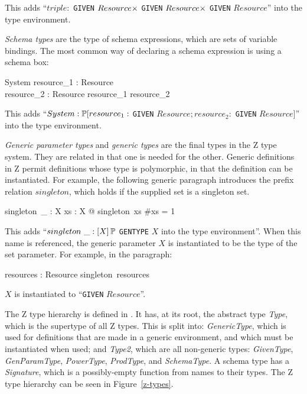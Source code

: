 This adds ``$triple : $ {\tt GIVEN}
$Resource \cross$ {\tt GIVEN} $Resource \cross$ {\tt GIVEN} $Resource$''
into the type environment.

{\em Schema types} are the type of schema expressions, which are sets
of variable bindings. The most common way of declaring a schema
expression is using a schema box:
\begin{schema}{System}
  resource_1 : Resource\\
  resource_2 : Resource
\where
  resource_1 \neq resource_2
\end{schema}

This adds ``$System
: \power [resource_1 : $ {\tt GIVEN} $Resource; resource_2 : $ {\tt GIVEN}
$Resource]$'' into the type environment.

{\em Generic parameter types} and {\em generic types} are the final
types in the Z type system. They are related in that one is needed for
the other. Generic definitions in Z permit definitions whose type is
polymorphic, in that the definition can be instantiated. For example,
the following generic paragraph introduces the prefix relation
$singleton$, which holds if the supplied set is a singleton set.
\begin{gendef}[X]
  singleton~\_ : \power X
\where
  \forall xs : \power X @ singleton~xs \iff \#xs = 1
\end{gendef}
%
%


This adds ``$singleton~\_ : [X] \power $ {\tt GENTYPE} $X$ into the
type environment''. When this name is referenced, the generic
parameter $X$ is instantiated to be the type of the set parameter. For
example, in the paragraph:
\begin{axdef}
  resources : \power Resource
\where
  singleton~resources
\end{axdef}

$X$ is instantiated to ``{\tt GIVEN} $Resource$''.

The Z type hierarchy is defined in . It has, at its root,
the abstract type {\em Type}, which is the supertype of all Z
types. This is split into: {\em GenericType}, which is used for
definitions that are made in a generic environment, and which must be
instantiated when used; and {\em Type2}, which are all non-generic
types: {\em GivenType}, {\em GenParamType}, {\em PowerType}, {\em
ProdType}, and {\em SchemaType}. A schema type has a {\em Signature},
which is a possibly-empty function from names to their types. The Z
type hierarchy can be seen in Figure~\ref{z-types}.

